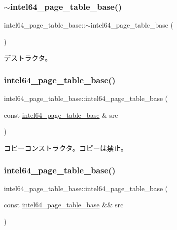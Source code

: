 \subsubsection{\texorpdfstring{$\sim$intel64\+\_\+page\+\_\+table\+\_\+base()}{~intel64\_page\_table\_base()}}
{\footnotesize\ttfamily intel64\+\_\+page\+\_\+table\+\_\+base\+::$\sim$intel64\+\_\+page\+\_\+table\+\_\+base (\begin{DoxyParamCaption}{ }\end{DoxyParamCaption})\hspace{0.3cm}{\ttfamily [virtual]}}

デストラクタ。 \hypertarget{classintel64__page__table__base_a6f41188f43304f66eded8e4237f9b9df}{}\label{classintel64__page__table__base_a6f41188f43304f66eded8e4237f9b9df} 
\subsubsection{\texorpdfstring{intel64\+\_\+page\+\_\+table\+\_\+base()}{intel64\_page\_table\_base()}\hspace{0.1cm}{\footnotesize\ttfamily [2/3]}}
{\footnotesize\ttfamily intel64\+\_\+page\+\_\+table\+\_\+base\+::intel64\+\_\+page\+\_\+table\+\_\+base (\begin{DoxyParamCaption}\item[{const \hyperlink{classintel64__page__table__base}{intel64\+\_\+page\+\_\+table\+\_\+base} \&}]{src }\end{DoxyParamCaption})\hspace{0.3cm}{\ttfamily [delete]}}

コピーコンストラクタ。コピーは禁止。 \hypertarget{classintel64__page__table__base_af03878ba31fbe3a1c5993f23b5060e6f}{}\label{classintel64__page__table__base_af03878ba31fbe3a1c5993f23b5060e6f} 
\subsubsection{\texorpdfstring{intel64\+\_\+page\+\_\+table\+\_\+base()}{intel64\_page\_table\_base()}\hspace{0.1cm}{\footnotesize\ttfamily [3/3]}}
{\footnotesize\ttfamily intel64\+\_\+page\+\_\+table\+\_\+base\+::intel64\+\_\+page\+\_\+table\+\_\+base (\begin{DoxyParamCaption}\item[{const \hyperlink{classintel64__page__table__base}{intel64\+\_\+page\+\_\+table\+\_\+base} \&\&}]{src }\end{DoxyParamCaption})\hspace{0.3cm}{\ttfamily [delete]}}

